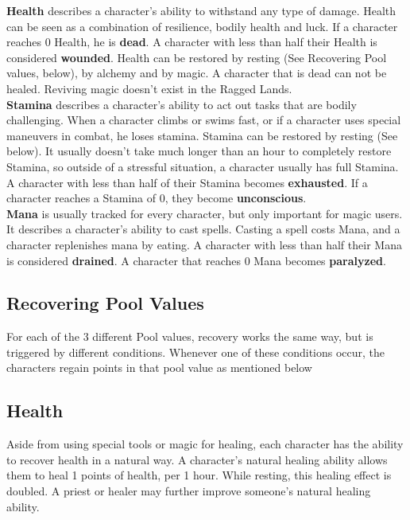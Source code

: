 \textbf{Health}\label{pool:health} describes a character's ability to withstand any type of damage.
Health can be seen as a combination of resilience, bodily health and luck.
If a character reaches 0 Health, he is \textbf{dead}.
A character with less than half their Health is considered \textbf{wounded}.
Health can be restored by resting (See Recovering Pool values, below), by alchemy and by magic.
A character that is dead can not be healed.
Reviving magic doesn't exist in the Ragged Lands.\\


\textbf{Stamina}\label{pool:stamina} describes a character's ability to act out tasks that are bodily challenging.
When a character climbs or swims fast, or if a character uses special maneuvers in combat, he loses stamina.
Stamina can be restored by resting (See below).
It usually doesn't take much longer than an hour to completely restore Stamina, so outside of a stressful situation, a character usually has full Stamina.
A character with less than half of their Stamina becomes \textbf{exhausted}.
If a character reaches a Stamina of 0, they become \textbf{unconscious}.\\


\textbf{Mana}\label{pool:mana} is usually tracked for every character, but only important for magic users.
It describes a character's ability to cast spells.
Casting a spell costs Mana, and a character replenishes mana by eating.
A character with less than half their Mana is considered \textbf{drained}.
A character that reaches 0 Mana becomes \textbf{paralyzed}.\\


\subsection{Recovering Pool Values}\label{subsec:recoveringPoolValues}
For each of the 3 different Pool values, recovery works the same way, but is triggered by different conditions.
Whenever one of these conditions occur, the characters regain points in that pool value as mentioned below


\subsection{Health}\label{subsec:recoverHealth}
Aside from using special tools or magic for healing, each character has the ability to recover health in a natural way.
A character's natural healing ability allows them to heal 1 points of health, per 1 hour.
While resting, this healing effect is doubled.
A priest or healer may further improve someone's natural healing ability.


